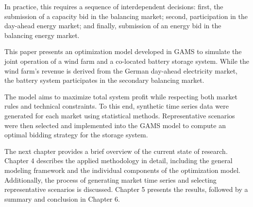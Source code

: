 In practice, this requires a sequence of interdependent decisions:
first, the submission of a capacity bid in the balancing market;
second, participation in the day-ahead energy market;
and finally, submission of an energy bid in the balancing energy market.

This paper presents an optimization model developed in GAMS to simulate the joint operation of
a wind farm and a co-located battery storage system. While the wind farm's revenue is derived
from the German day-ahead electricity market, the battery system participates in the
secondary balancing market.

The model aims to maximize total system profit while respecting both market rules
and technical constraints. To this end, synthetic time series data were generated for each market using statistical methods.
Representative scenarios were then selected and implemented into the GAMS model to compute
an optimal bidding strategy for the storage system.

The next chapter provides a brief overview of the current state of research.
Chapter 4 describes the applied methodology in detail, including the general modeling framework
and the individual components of the optimization model.
Additionally, the process of generating market time series and selecting representative scenarios
is discussed. Chapter 5 presents the results, followed by a summary and conclusion in Chapter 6.
